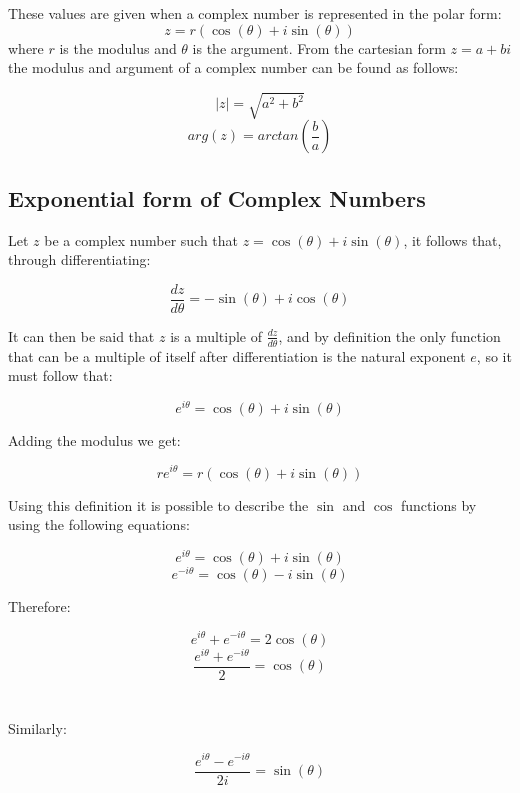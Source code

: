 \documentclass{article}
\begin{document}
These values are given when a complex number is represented in the polar form:
\[z=r\left(\cos\left(\theta\right) + i\sin\left(\theta\right)\right)\]
where \(r\) is the modulus and \(\theta\) is the argument. From the cartesian form \(z=a+bi\) the modulus and argument of a complex number can be found as follows:

\[|z|=\sqrt{a^2 + b^2}\]
\[arg\left(z\right) = arctan\left(\frac{b}{a}\right)\]

\subsection{Exponential form of Complex Numbers}

Let \(z\) be a complex number such that \(z=\cos\left(\theta\right) +i\sin\left(\theta\right)\), it follows that, through differentiating:

\[\frac{dz}{d\theta}=-\sin\left(\theta\right) +i\cos\left(\theta\right)\]

\noindent It can then be said that \(z\) is a multiple of \(\frac{dz}{d\theta}\), and by definition the only function that can be a multiple of itself after differentiation is the natural exponent \(e\), so it must follow that:

\[e^{i\theta}=\cos\left(\theta\right) +i\sin\left(\theta\right)\]

\noindent Adding the modulus we get:

\[re^{i\theta} = r(\cos\left(\theta\right) +i\sin\left(\theta\right))\]

\noindent Using this definition it is possible to describe the \(\sin\) and \(\cos\) functions by using the following equations:

\[e^{i\theta}= \cos\left(\theta\right)+i\sin\left(\theta\right)\]
\[e^{-i\theta}=\cos\left(\theta\right)-i\sin\left(\theta\right)\]

\noindent Therefore:

\[e^{i\theta}+e^{-i\theta}=2\cos\left(\theta\right)\]
\[\frac{e^{i\theta}+e^{-i\theta}}{2}=\cos\left(\theta\right)\] \\\\

Similarly:

\[\frac{e^{i\theta}-e^{-i\theta}}{2i}=\sin\left(\theta\right)\]
\end{document}
